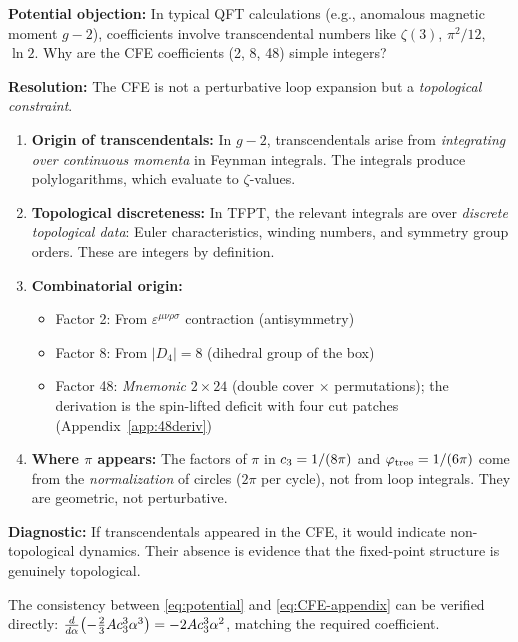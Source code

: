 \begin{tcolorbox}[colback=purple!3, colframe=purple!50!black, 
    title={\textbf{Why Integer Coefficients? (No $\zeta(3)$, $\ln 2$, etc.)}}, fonttitle=\bfseries\small]
\textbf{Potential objection:} In typical QFT calculations (e.g., anomalous magnetic moment $g-2$), 
coefficients involve transcendental numbers like $\zeta(3)$, $\pi^2/12$, $\ln 2$. Why are the 
CFE coefficients (2, 8, 48) simple integers?

\textbf{Resolution:} The CFE is not a perturbative loop expansion but a \emph{topological constraint}.

\begin{enumerate}[leftmargin=1.5em, topsep=2pt, itemsep=1pt]
    \item \textbf{Origin of transcendentals:} In $g-2$, transcendentals arise from 
        \emph{integrating over continuous momenta} in Feynman integrals. The integrals 
        produce polylogarithms, which evaluate to $\zeta$-values.
    
    \item \textbf{Topological discreteness:} In TFPT, the relevant integrals are over 
        \emph{discrete topological data}: Euler characteristics, winding numbers, and 
        symmetry group orders. These are integers by definition.
    
    \item \textbf{Combinatorial origin:}
        \begin{itemize}[leftmargin=1em, topsep=1pt, itemsep=1pt]
            \item Factor 2: From $\varepsilon^{\mu\nu\rho\sigma}$ contraction (antisymmetry)
            \item Factor 8: From $|D_4| = 8$ (dihedral group of the box)
            \item Factor 48: \emph{Mnemonic} $2 \times 24$ (double cover $\times$ permutations); the derivation is the spin-lifted deficit with four cut patches (Appendix~\ref{app:48deriv})
        \end{itemize}
    
    \item \textbf{Where $\pi$ appears:} The factors of $\pi$ in $c_3 = 1/(8\pi)$ and 
        $\varphi_{\mathrm{tree}} = 1/(6\pi)$ come from the \emph{normalization} of circles ($2\pi$ per cycle), 
        not from loop integrals. They are geometric, not perturbative.
\end{enumerate}

\textbf{Diagnostic:} If transcendentals appeared in the CFE, it would indicate non-topological 
dynamics. Their absence is evidence that the fixed-point structure is genuinely topological.
\end{tcolorbox}

\begin{remark}
The consistency between \eqref{eq:potential} and \eqref{eq:CFE-appendix} can be 
verified directly: $\frac{d}{d\alpha}\bigl(-\frac{2}{3}Ac_3^3\alpha^3\bigr) 
= -2Ac_3^3\alpha^2$, matching the required coefficient.
\end{remark}

